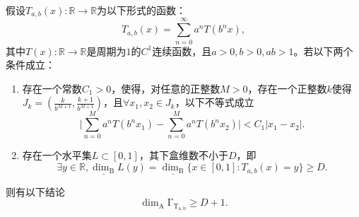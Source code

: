 \begin{lemma}\cite{1}
      假设$T_{a,b}(x):\mathbb{R}\rightarrow\mathbb{R}$为以下形式的函数：
      $$
      T_{a,b}(x)=\sum_{n=0}^\infty a^nT(b^nx),
      $$
      其中$T(x):\mathbb{R}\rightarrow\mathbb{R}$是周期为$1$的$C^1$连续函数，且$a>0,b>0,ab>1$。若以下两个条件成立：
      \begin{enumerate}
            \item 存在一个常数$C_1>0$，使得，对任意的正整数$M>0$，存在一个正整数$k$使得$J_k=(\frac{k}{b^{M+1}},\frac{k+1}{b^{M+1}})$，且$\forall x_1,x_2\in J_k$，以下不等式成立
            $$
            \Big|\sum_{n=0}^Ma^nT(b^nx_1)-\sum_{n=0}^Ma^nT(b^nx_2)\Big|<C_1|x_1-x_2|.
            $$
            \item 存在一个水平集$L\subset[0,1]$，其下盒维数不小于$D$，即
            $$
            \exists y\in\mathbb{R},\underline{\mathrm{\dim_B}}L(y)=\underline{\mathrm{\dim_B}}\{x\in[0,1]:T_{a,b}(x)=y\}\ge D.
            $$
      \end{enumerate}

      则有以下结论
      $$
      \mathrm{\dim_A\Gamma_{T_{a,b}}}\ge D+1.
      $$

\end{lemma}

